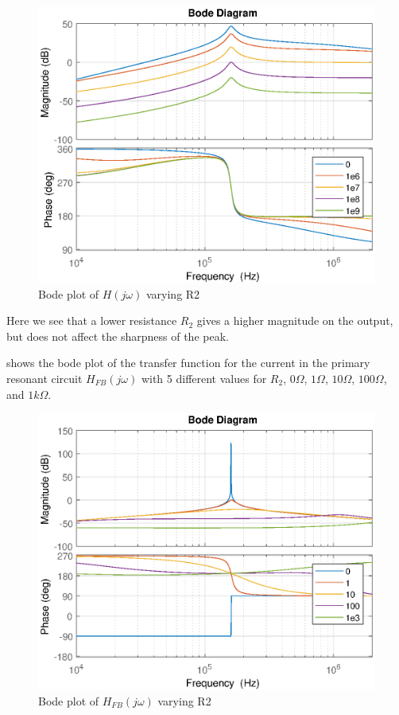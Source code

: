 \begin{figure}[H]
    \centering
    \includegraphics[width=\textwidth]{img/CoilRigBode_R2.eps}
    \caption{Bode plot of $H(j\omega)$ varying R2}
    \label{fig:bode_r2}
\end{figure}

Here we see that a lower resistance $R_2$ gives a higher magnitude on the output, but does not affect the sharpness of the peak.

 shows the bode plot of the transfer function for the current in the primary resonant circuit $H_{FB}(j\omega)$ with 5 different values for $R_2$, $0\Omega$, $1\Omega$, $10\Omega$, $100\Omega$, and $1k\Omega$.
\begin{figure}[H]
    \centering
    \includegraphics[width=\textwidth]{img/FeedBackBode_R2.eps}
    \caption{Bode plot of $H_{FB}(j\omega)$ varying R2}
    \label{fig:fbbode_r2}
\end{figure}

